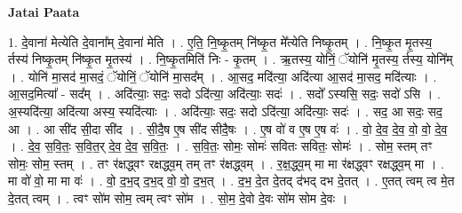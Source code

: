 \documentclass[17pt]{extarticle}
\begin{document}
\textbf{Jatai Paata} \newline

1. दे॒वाना॑ मेत्येति दे॒वाना᳚म् दे॒वाना॑ मेति । . ए॒ति॒ नि॒ष्कृ॒तम् नि॑ष्कृ॒त मे᳚त्येति निष्कृ॒तम् । . नि॒ष्कृ॒त मृ॒तस्य॒ र्तस्य॑ निष्कृ॒तम् नि॑ष्कृ॒त मृ॒तस्य॑ । . नि॒ष्कृ॒तमिति॑ निः - कृ॒तम् । . ऋ॒तस्य॒ योनिं॒ ॅयोनि॑ मृ॒तस्य॒ र्तस्य॒ योनि᳚म् । . योनि॑ मा॒सद॑ मा॒सदं॒ ॅयोनिं॒ ॅयोनि॑ मा॒सद᳚म् । . आ॒सद॒ मदि॑त्या॒ अदि॑त्या आ॒सद॑ मा॒सद॒ मदि॑त्याः । . आ॒सद॒मित्या᳚ - सद᳚म् । . अदि॑त्याः॒ सदः॒ सदो ऽदि॑त्या॒ अदि॑त्याः॒ सदः॑ । . सदो᳚ ऽस्यसि॒ सदः॒ सदो॑ ऽसि । . अ॒स्यदि॑त्या॒ अदि॑त्या अस्य॒ स्यदि॑त्याः । . अदि॑त्याः॒ सदः॒ सदो ऽदि॑त्या॒ अदि॑त्याः॒ सदः॑ । . सद॒ आ सदः॒ सद॒ आ । . आ सी॑द सी॒दा सी॑द । . सी॒दै॒ष ए॒ष सी॑द सीदै॒षः । . ए॒ष वो॑ व ए॒ष ए॒ष वः॑ । . वो॒ दे॒व॒ दे॒व॒ वो॒ वो॒ दे॒व॒ । . दे॒व॒ स॒वि॒तः॒ स॒वि॒त॒र् दे॒व॒ दे॒व॒ स॒वि॒तः॒ । . स॒वि॒तः॒ सोमः॒ सोमः॑ सवितः सवितः॒ सोमः॑ । . सोम॒ स्तम् तꣳ सोमः॒ सोम॒ स्तम् । . तꣳ र॑क्षद्ध्वꣳ रक्षद्ध्व॒म् तम् तꣳ र॑क्षद्ध्वम् । . र॒क्ष॒द्ध्व॒म् मा मा र॑क्षद्ध्वꣳ रक्षद्ध्व॒म् मा । . मा वो॑ वो॒ मा मा वः॑ । . वो॒ द॒भ॒द् द॒भ॒द् वो॒ वो॒ द॒भ॒त् । . द॒भ॒ दे॒त दे॒तद् द॑भद् दभ दे॒तत् । . ए॒तत् त्वम् त्व मे॒त दे॒तत् त्वम् । . त्वꣳ सो॑म सोम॒ त्वम् त्वꣳ सो॑म । . सो॒म॒ दे॒वो दे॒वः सो॑म सोम दे॒वः । \newline
\end{document}
